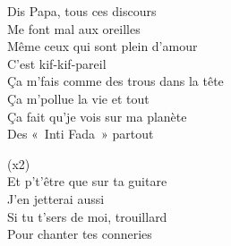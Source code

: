 \documentclass{novel}
\begin{document}
\begin{multicols}{2}
Dis Papa, tous ces discours \\
Me font mal aux oreilles \\
Même ceux qui sont plein d'amour \\
C'est kif-kif-pareil \\
Ça m'fais comme des trous dans la tête \\
Ça m'pollue la vie et tout \\
Ça fait qu'je vois sur ma planète \\
Des «~Inti Fada~» partout \\

\begin{bfseries}
[Répétition] (x2)\\
Et p't'être que sur ta guitare \\
J'en jetterai aussi \\
Si tu t'sers de moi, trouillard \\
Pour chanter tes conneries 
\end{bfseries}

\end{multicols}
\end{document}

